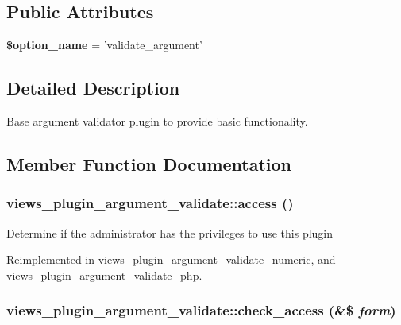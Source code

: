 \subsection*{Public Attributes}
\begin{CompactItemize}
\item 
\hypertarget{classviews__plugin__argument__validate_8a0df595e759a439b3d6685b6c65f594}{
\textbf{\$option\_\-name} = 'validate\_\-argument'}
\label{classviews__plugin__argument__validate_8a0df595e759a439b3d6685b6c65f594}

\end{CompactItemize}


\subsection{Detailed Description}
Base argument validator plugin to provide basic functionality. 

\subsection{Member Function Documentation}
\hypertarget{classviews__plugin__argument__validate_b90c095a5a91dcf8dfae02dc975d974e}{
\subsubsection[{access}]{\setlength{\rightskip}{0pt plus 5cm}views\_\-plugin\_\-argument\_\-validate::access ()}}
\label{classviews__plugin__argument__validate_b90c095a5a91dcf8dfae02dc975d974e}


Determine if the administrator has the privileges to use this plugin 

Reimplemented in \hyperlink{classviews__plugin__argument__validate__numeric_fa33dbc88c165f2505c5fdf1c9263b8f}{views\_\-plugin\_\-argument\_\-validate\_\-numeric}, and \hyperlink{classviews__plugin__argument__validate__php_11100ee9f3e1d9ec27f3f1b151994d1c}{views\_\-plugin\_\-argument\_\-validate\_\-php}.\hypertarget{classviews__plugin__argument__validate_0e10193a9cac68bcfb9dccab9277c35a}{
\subsubsection[{check\_\-access}]{\setlength{\rightskip}{0pt plus 5cm}views\_\-plugin\_\-argument\_\-validate::check\_\-access (\&\$ {\em form})}}
\label{classviews__plugin__argument__validate_0e10193a9cac68bcfb9dccab9277c35a}


